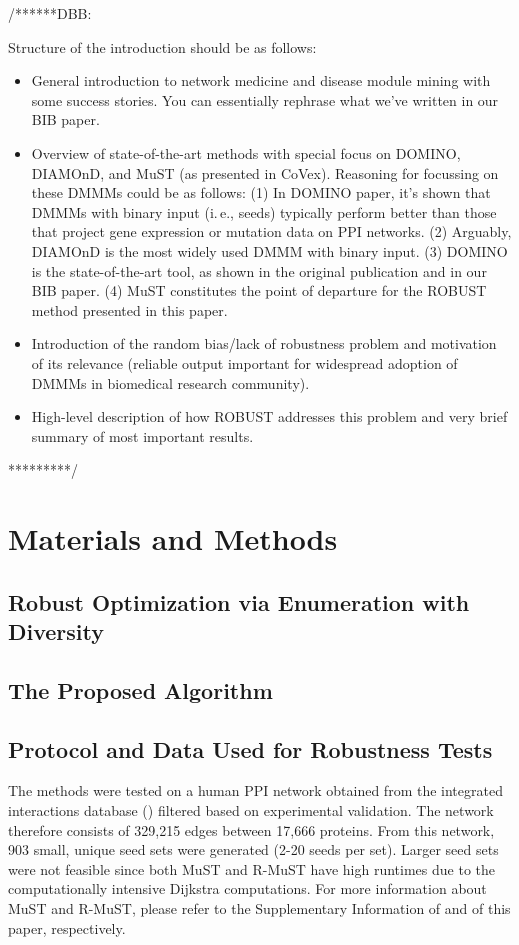 \documentclass{bioinfo}
\makeatletter
\newcommand{\ie}{i.\,e.\@\xspace}
\newcommand{\dbb}[1]{{\color{blue}/******DBB:

#1

*********/
}}
\makeatother
\begin{document}
\dbb{Structure of the introduction should be as follows:
\begin{itemize}
\item General introduction to network medicine and disease module mining with some success stories. You can essentially rephrase what we've written in our BIB paper.
\item Overview of state-of-the-art methods with special focus on DOMINO, DIAMOnD, and MuST (as presented in CoVex). Reasoning for focussing on these DMMMs could be as follows: (1) In DOMINO paper, it's shown that DMMMs with binary input (\ie, seeds) typically perform better than those that project gene expression or mutation data on PPI networks. (2) Arguably, DIAMOnD is the most widely used DMMM with binary input. (3) DOMINO is the state-of-the-art tool, as shown in the original publication and in our BIB paper. (4) MuST constitutes the point of departure for the ROBUST method presented in this paper.
\item Introduction of the random bias/lack of robustness problem and motivation of its relevance (reliable output important for widespread adoption of DMMMs in biomedical research community).
\item High-level description of how ROBUST addresses this problem and very brief summary of most important results.
\end{itemize}
}

\section{Materials and Methods}

\subsection{Robust Optimization via Enumeration with Diversity}

\subsection{The Proposed Algorithm}

\subsection{Protocol and Data Used for Robustness Tests}

The methods were tested on a human PPI network obtained from the integrated interactions database (\cite{iid_kotlyar2019}) filtered based on experimental validation. The network therefore consists of 329,215 edges between 17,666 proteins. From this network, 903 small, unique seed sets were generated (2-20 seeds per set). Larger seed sets were not feasible since both MuST and R-MuST have high runtimes due to the computationally intensive Dijkstra computations. For more information about MuST and R-MuST, please refer to the Supplementary Information of \cite{covex_sadegh2020} and of this paper, respectively.  %
\end{document}
